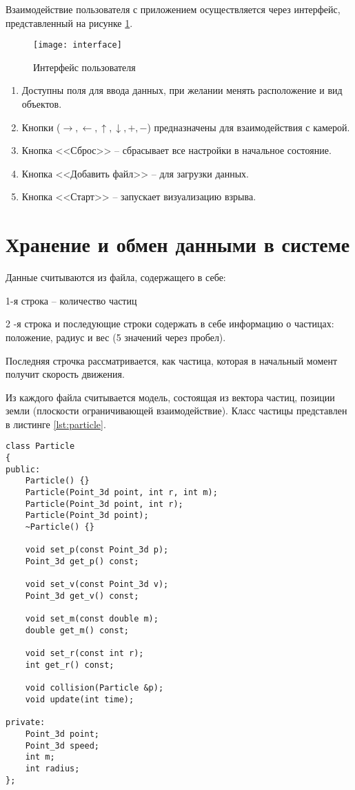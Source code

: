 Взаимодействие пользователя с приложением осуществляется через интерфейс, представленный на рисунке \ref{img:interface}. 

\begin{figure}[H]
	\centering
	\texttt{[image: interface]}
	\caption{Интерфейс пользователя}
	\label{img:interface}
\end{figure}

\begin{enumerate}
	\item Доступны поля для ввода данных, при желании менять расположение и вид объектов. 
	\item Кнопки ($\to, \leftarrow, \uparrow, \downarrow, +, -$) предназначены для взаимодействия с камерой. 
	\item Кнопка  <<Сброс>> -- сбрасывает все настройки в начальное состояние. 
	\item Кнопка <<Добавить файл>> -- для загрузки данных. 
	\item Кнопка <<Старт>> -- запускает визуализацию взрыва.   
\end{enumerate}

\section{\textbf{Хранение и обмен данными в системе }}

Данные считываются из файла, содержащего в себе:

1-я строка -- количество частиц

2 -я строка и последующие строки содержать в себе информацию о частицах: положение, радиус и вес (5 значений через пробел). 

Последняя строчка рассматривается, как частица, которая в начальный момент получит скорость движения. 

Из каждого файла считывается модель, состоящая из вектора частиц, позиции земли (плоскости ограничивающей взаимодействие). Класс частицы представлен в листинге \ref{lst:particle}. 


\begin{lstlisting}[caption=Класс частицы, label = lst:particle, style=simplecode]
class Particle
{
public:
    Particle() {}
    Particle(Point_3d point, int r, int m);
    Particle(Point_3d point, int r);
    Particle(Point_3d point);
    ~Particle() {}

    void set_p(const Point_3d p);
    Point_3d get_p() const;

    void set_v(const Point_3d v);
    Point_3d get_v() const;

    void set_m(const double m);
    double get_m() const;

    void set_r(const int r);
    int get_r() const;

    void collision(Particle &p);
    void update(int time);

private:
    Point_3d point;
    Point_3d speed;
    int m;
    int radius;
};
\end{lstlisting}

